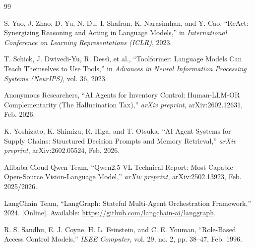 \documentclass[11pt,a4paper]{article}
\begin{document}
\vspace{0.5cm}

\begin{thebibliography}{99}
\small
\setlength{\itemsep}{1pt}

 S. Yao, J. Zhao, D. Yu, N. Du, I. Shafran, K. Narasimhan, and Y. Cao, ``ReAct: Synergizing Reasoning and Acting in Language Models,'' in \textit{International Conference on Learning Representations (ICLR)}, 2023.

 T. Schick, J. Dwivedi-Yu, R. Dessì, et al., ``Toolformer: Language Models Can Teach Themselves to Use Tools,'' in \textit{Advances in Neural Information Processing Systems (NeurIPS)}, vol. 36, 2023.

 Anonymous Researchers, ``AI Agents for Inventory Control: Human-LLM-OR Complementarity (The Hallucination Tax),'' \textit{arXiv preprint}, arXiv:2602.12631, Feb. 2026.

 K. Yoshizato, K. Shimizu, R. Higa, and T. Otsuka, ``AI Agent Systems for Supply Chains: Structured Decision Prompts and Memory Retrieval,'' \textit{arXiv preprint}, arXiv:2602.05524, Feb. 2026.

 Alibaba Cloud Qwen Team, ``Qwen2.5-VL Technical Report: Most Capable Open-Source Vision-Language Model,'' \textit{arXiv preprint}, arXiv:2502.13923, Feb. 2025/2026.

 LangChain Team, ``LangGraph: Stateful Multi-Agent Orchestration Framework,'' 2024. [Online]. Available: \url{https://github.com/langchain-ai/langgraph}.

 R. S. Sandhu, E. J. Coyne, H. L. Feinstein, and C. E. Youman, ``Role-Based Access Control Models,'' \textit{IEEE Computer}, vol. 29, no. 2, pp. 38--47, Feb. 1996.

\end{thebibliography}
\end{document}
